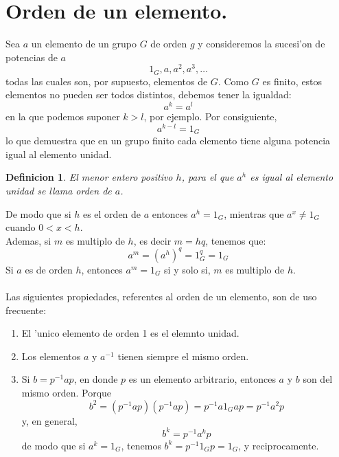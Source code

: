 \documentclass[a4paper,openright,12pt]{report}
\numberwithin{equation}{section} %
\newtheorem{definicion}{Definicion}[section] %
\begin{document}
\section{Orden de un elemento.}
Sea $a$ un elemento de un grupo $G$ de orden $g$ y consideremos la sucesi'on de potencias de $a$
\[
1_{G},a,a^{2},a^{3},\ldots
\]
todas las cuales son, por supuesto, elementos de $G$. Como $G$ es finito, estos elementos no pueden ser todos distintos, debemos tener la igualdad:
\[
a^{k}=a^{l}
\]
en la que podemos suponer $k>l$, por ejemplo. Por consiguiente,
\[
a^{k-l}=1_{G}
\]
lo que demuestra que en un grupo finito cada elemento tiene alguna potencia igual al elemento unidad.
\begin{definicion}
El menor entero positivo $h$, para el que $a^{h}$ es igual al elemento unidad se llama orden de $a$.
\end{definicion}
De modo que si $h$ es el orden de $a$ entonces $a^{h}=1_{G}$, mientras que $a^{x}\neq
1_{G}$ cuando $0<x<h$.\\
Ademas, si $m$ es multiplo de $h$, es decir $m=hq$, tenemos que:
\[
a^{m}=(a^{h})^{q}=1_{G}^{q}=1_{G}
\]
Si $a$ es de orden $h$, entonces $a^{m}=1_{G}$ si y solo si, $m$ es multiplo de $h$.\\
\\
Las siguientes propiedades, referentes al orden de un elemento, son de uso frecuente:
\begin{enumerate}
\item El 'unico elemento de orden 1 es el elemnto unidad.
\item Los elementos $a$ y $a^{-1}$  tienen siempre el mismo orden.
\item Si $b=p^{-1}ap$, en donde $p$ es un elemento arbitrario, entonces $a$ y $b$ son del mismo orden. Porque 
\[
b^{2}=(p^{-1}ap)(p^{-1}ap)=p^{-1}a1_{G}ap=p^{-1}a^{2}p
\]
y, en general,
\[
b^{k}=p^{-1}a^{k}p
\]
de modo que si $a^{k}=1_{G}$, tenemos $b^{k}=p^{-1}1_{G}p=1_{G}$, y reciprocamente.
\end{enumerate}
\end{document}
